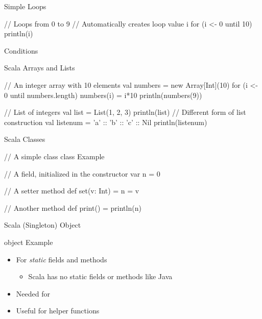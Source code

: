 \begin{frame}[fragile]{Simple Loops}
\begin{chisel}
// Loops from 0 to 9
// Automatically creates loop value i
for (i <- 0 until 10) {
  println(i)
}
\end{chisel}
\end{frame}

\begin{frame}[fragile]{Conditions}
\end{frame}

\begin{frame}[fragile]{Scala Arrays and Lists}
\begin{chisel}
// An integer array with 10 elements
val numbers = new Array[Int](10)
for (i <- 0 until numbers.length) {
  numbers(i) = i*10
}
println(numbers(9))


// List of integers
val list = List(1, 2, 3)
println(list)
// Different form of list construction
val listenum = 'a' :: 'b' :: 'c' :: Nil
println(listenum)
\end{chisel}
\end{frame}


\begin{frame}[fragile]{Scala Classes}
\begin{chisel}
// A simple class
class Example {
  // A field, initialized in the constructor
  var n = 0
  
  // A setter method
  def set(v: Int) = {
    n = v
  }
  
  // Another method
  def print() = {
    println(n)
  }
}
\end{chisel}
\end{frame}

\begin{frame}[fragile]{Scala (Singleton) Object}
\begin{chisel}
object Example {}
\end{chisel}
\begin{itemize}
\item For \emph{static} fields and methods
\begin{itemize}
\item Scala has no static fields or methods like Java
\end{itemize}
\item Needed for 
\item Useful for helper functions
\end{itemize}
\end{frame}

